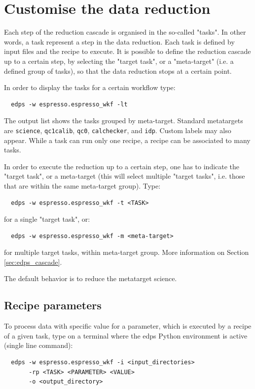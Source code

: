 
\section{Customise the data reduction}
\label{sec:edps_parameters}
Each step of the reduction cascade is organised in the so-called "tasks". In other words, a task represent a step in the data reduction. Each task is defined by input files and the recipe to execute. It is possible to define the reduction cascade up to a certain step, by selecting the "target task", or a "meta-target" (i.e. a defined group of tasks), so that the data reduction stops at a certain point.

In order to display the tasks for a certain workflow type:
\begin{verbatim}
  edps -w espresso.espresso_wkf -lt
\end{verbatim}
 
The output list shows the tasks grouped by meta-target. Standard metatargets are {\tt science}, {\tt qc1calib}, {\tt qc0}, {\tt calchecker}, and {\tt idp}. Custom labels may also appear. While a task can run only one recipe, a recipe can be associated to many tasks.

In order to execute the reduction up to a certain step, one has to indicate the "target task", or a meta-target (this will select multiple "target tasks", i.e. those that are within the same meta-target group). Type:
\begin{verbatim}
  edps -w espresso.espresso_wkf -t <TASK>
\end{verbatim}  
for a single "target task", or:
\begin{verbatim}
  edps -w espresso.espresso_wkf -m <meta-target>
\end{verbatim}  
for multiple target tasks, within meta-target group.
More information on Section \ref{sec:edps_cascade}.

The default behavior is to reduce the metatarget science.


\subsection{Recipe parameters}
\label{sec:edps_recipe_parameters}

To process data with specific value for a parameter, which is executed by a recipe of a given task, type on a terminal where the edps Python environment is active (single line command):
\begin{verbatim}
  edps -w espresso.espresso_wkf -i <input_directories> 
       -rp <TASK> <PARAMETER> <VALUE> 
       -o <output_directory>
\end{verbatim}  
 
